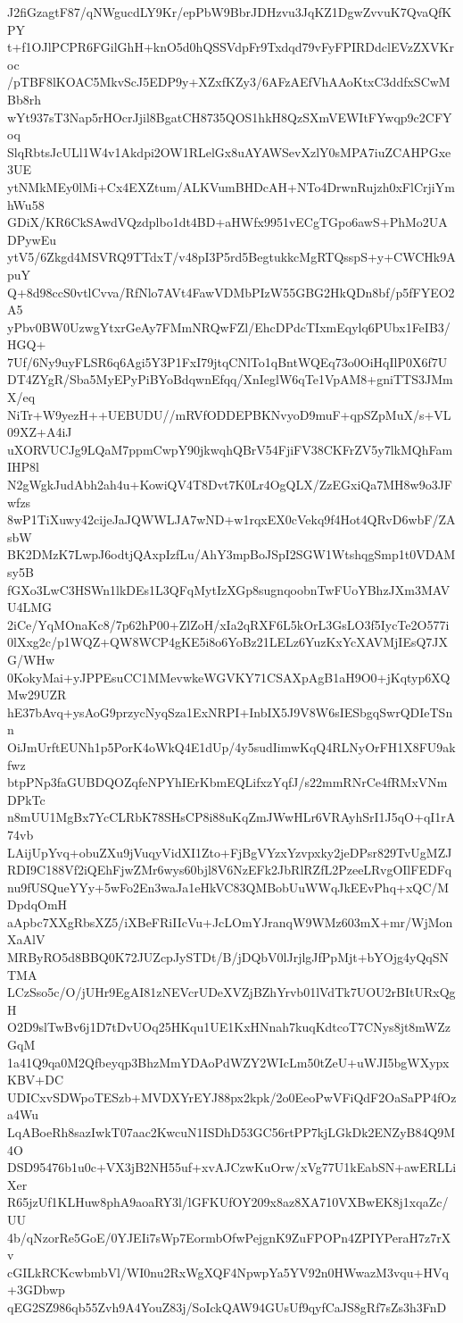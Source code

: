 J2fiGzagtF87/qNWgucdLY9Kr/epPbW9BbrJDHzvu3JqKZ1DgwZvvuK7QvaQfKPY
t+f1OJlPCPR6FGilGhH+knO5d0hQSSVdpFr9Txdqd79vFyFPIRDdclEVzZXVKroc
/pTBF8lKOAC5MkvScJ5EDP9y+XZxfKZy3/6AFzAEfVhAAoKtxC3ddfxSCwMBb8rh
wYt937sT3Nap5rHOcrJjil8BgatCH8735QOS1hkH8QzSXmVEWItFYwqp9c2CFYoq
SlqRbtsJcULl1W4v1Akdpi2OW1RLelGx8uAYAWSevXzlY0sMPA7iuZCAHPGxe3UE
ytNMkMEy0lMi+Cx4EXZtum/ALKVumBHDcAH+NTo4DrwnRujzh0xFlCrjiYmhWu58
GDiX/KR6CkSAwdVQzdplbo1dt4BD+aHWfx9951vECgTGpo6awS+PhMo2UADPywEu
ytV5/6Zkgd4MSVRQ9TTdxT/v48pI3P5rd5BegtukkcMgRTQsspS+y+CWCHk9ApuY
Q+8d98ccS0vtlCvva/RfNlo7AVt4FawVDMbPIzW55GBG2HkQDn8bf/p5fFYEO2A5
yPbv0BW0UzwgYtxrGeAy7FMmNRQwFZl/EhcDPdcTIxmEqylq6PUbx1FeIB3/HGQ+
7Uf/6Ny9uyFLSR6q6Agi5Y3P1FxI79jtqCNlTo1qBntWQEq73o0OiHqIlP0X6f7U
DT4ZYgR/Sba5MyEPyPiBYoBdqwnEfqq/XnIeglW6qTe1VpAM8+gniTTS3JMmX/eq
NiTr+W9yezH++UEBUDU//mRVfODDEPBKNvyoD9muF+qpSZpMuX/s+VL09XZ+A4iJ
uXORVUCJg9LQaM7ppmCwpY90jkwqhQBrV54FjiFV38CKFrZV5y7lkMQhFamIHP8l
N2gWgkJudAbh2ah4u+KowiQV4T8Dvt7K0Lr4OgQLX/ZzEGxiQa7MH8w9o3JFwfzs
8wP1TiXuwy42cijeJaJQWWLJA7wND+w1rqxEX0cVekq9f4Hot4QRvD6wbF/ZAsbW
BK2DMzK7LwpJ6odtjQAxpIzfLu/AhY3mpBoJSpI2SGW1WtshqgSmp1t0VDAMsy5B
fGXo3LwC3HSWn1lkDEs1L3QFqMytIzXGp8sugnqoobnTwFUoYBhzJXm3MAVU4LMG
2iCe/YqMOnaKc8/7p62hP00+ZlZoH/xIa2qRXF6L5kOrL3GsLO3f5IycTe2O577i
0lXxg2c/p1WQZ+QW8WCP4gKE5i8o6YoBz21LELz6YuzKxYcXAVMjIEsQ7JXG/WHw
0KokyMai+yJPPEsuCC1MMevwkeWGVKY71CSAXpAgB1aH9O0+jKqtyp6XQMw29UZR
hE37bAvq+ysAoG9przycNyqSza1ExNRPI+InbIX5J9V8W6sIESbgqSwrQDIeTSnn
OiJmUrftEUNh1p5PorK4oWkQ4E1dUp/4y5sudIimwKqQ4RLNyOrFH1X8FU9akfwz
btpPNp3faGUBDQOZqfeNPYhIErKbmEQLifxzYqfJ/s22mmRNrCe4fRMxVNmDPkTc
n8mUU1MgBx7YcCLRbK78SHsCP8i88uKqZmJWwHLr6VRAyhSrI1J5qO+qI1rA74vb
LAijUpYvq+obuZXu9jVuqyVidXI1Zto+FjBgVYzxYzvpxky2jeDPsr829TvUgMZJ
RDI9C188Vf2iQEhFjwZMr6wys60bjl8V6NzEFk2JbRlRZfL2PzeeLRvgOIlFEDFq
nu9fUSQueYYy+5wFo2En3waJa1eHkVC83QMBobUuWWqJkEEvPhq+xQC/MDpdqOmH
aApbc7XXgRbsXZ5/iXBeFRiIIcVu+JcLOmYJranqW9WMz603mX+mr/WjMonXaAlV
MRByRO5d8BBQ0K72JUZcpJySTDt/B/jDQbV0lJrjlgJfPpMjt+bYOjg4yQqSNTMA
LCzSso5c/O/jUHr9EgAI81zNEVcrUDeXVZjBZhYrvb01lVdTk7UOU2rBItURxQgH
O2D9slTwBv6j1D7tDvUOq25HKqu1UE1KxHNnah7kuqKdtcoT7CNys8jt8mWZzGqM
1a41Q9qa0M2Qfbeyqp3BhzMmYDAoPdWZY2WIcLm50tZeU+uWJI5bgWXypxKBV+DC
UDICxvSDWpoTESzb+MVDXYrEYJ88px2kpk/2o0EeoPwVFiQdF2OaSaPP4fOza4Wu
LqABoeRh8sazIwkT07aac2KwcuN1ISDhD53GC56rtPP7kjLGkDk2ENZyB84Q9M4O
DSD95476b1u0c+VX3jB2NH55uf+xvAJCzwKuOrw/xVg77U1kEabSN+awERLLiXer
R65jzUf1KLHuw8phA9aoaRY3l/lGFKUfOY209x8az8XA710VXBwEK8j1xqaZc/UU
4b/qNzorRe5GoE/0YJEIi7sWp7EormbOfwPejgnK9ZuFPOPn4ZPIYPeraH7z7rXv
cGILkRCKcwbmbVl/WI0nu2RxWgXQF4NpwpYa5YV92n0HWwazM3vqu+HVq+3GDbwp
qEG2SZ986qb55Zvh9A4YouZ83j/SoIckQAW94GUsUf9qyfCaJS8gRf7sZs3h3FnD
